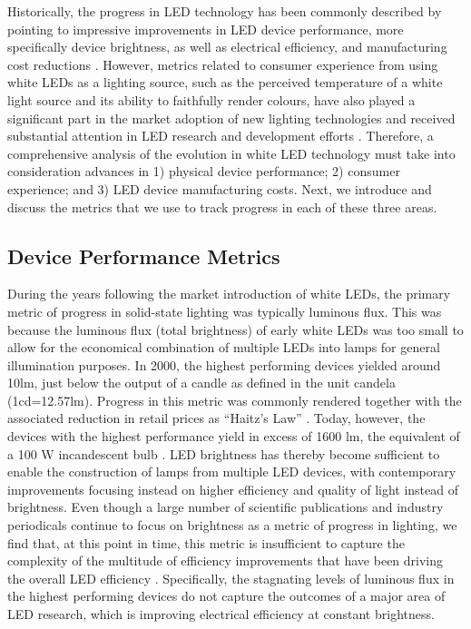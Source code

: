 \documentclass[parskip=full]{article}
\begin{document}
Historically, the progress in LED technology has been commonly described by pointing to impressive improvements in LED device performance, more specifically device brightness, as well as electrical efficiency, and manufacturing cost reductions \cite{Taki2019}. However, metrics related to consumer experience from using white LEDs as a lighting source, such as the perceived temperature of a white light source and its ability to faithfully render colours, have also played a significant part in the market adoption of new lighting technologies \cite{Menanteau2000,Sandahl2006,CAIRD2008,murphy2012governing} and received substantial attention in LED research and development efforts \cite{azevedo2009transition,cho2017white}. Therefore, a comprehensive analysis of the evolution in white LED technology must take into consideration advances in 1) physical device performance; 2) consumer experience; and 3) LED device manufacturing costs. Next, we introduce and discuss the metrics that we use to track progress in each of these three areas.

\subsection{Device Performance Metrics}
\label{sec:device_performance_metrics}

During the years following the market introduction of white LEDs, the primary metric of progress in solid-state lighting was typically luminous flux. This was because the luminous flux (total brightness) of early white LEDs was too small to allow for the economical combination of multiple LEDs into lamps for general illumination purposes. In 2000, the highest performing devices yielded around 10lm, just below the output of a candle as defined in the unit candela (1cd=12.57lm)\cite{haitz2011solid}. Progress in this metric was commonly rendered together with the associated reduction in retail prices as “Haitz’s Law” \cite{haitz1999case,haitz2011solid}. Today, however, the devices with the highest performance yield in excess of 1600 lm, the equivalent of a 100 W incandescent bulb \cite{cree2020bright}. LED brightness has thereby become sufficient to enable the construction of lamps from multiple LED devices, with contemporary improvements focusing instead on higher efficiency and quality of light instead of brightness. Even though a large number of scientific publications and industry periodicals continue to focus on brightness as a metric of progress in lighting, we find that, at this point in time, this metric is insufficient to capture the complexity of the multitude of efficiency improvements that have been driving the overall LED efficiency \cite{weinold2021compound}. Specifically, the stagnating levels of luminous flux in the highest performing devices do not capture the outcomes of a major area of LED research, which is improving electrical efficiency at constant brightness.
\end{document}
